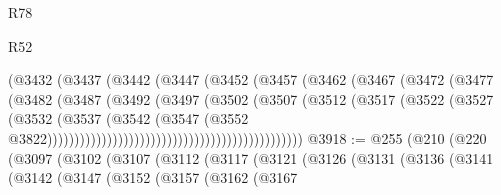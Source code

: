 \begin{lexlean}{R78}
\begin{lexlean}{R52}
\begin{coremodule}
{{{{{{{{{{{{{{{{{{{{{{{{{{{{{{{{{{{{{{{{{{{{{{{{{{{{{{{{{{{{{{{{{{{{{{{{{{{{{{{{{{{{{{{{{{{{{{{{{{{{{{{{{{{{{{{{{{{{{{{{{{{{{{{{{{{{{{{{{{{{{{{{{{{{{{{{{{{{{{{{{{{{{{{{{{{{{{{{{{{{{{{{{{{{{{{{{{{{{{                                                (@3432
                                                  (@3437
                                                    (@3442
                                                      (@3447
                                                        (@3452
                                                          (@3457
                                                            (@3462
                                                              (@3467
                                                                (@3472
                                                                  (@3477
                                                                    (@3482
                                                                      (@3487
                                                                        (@3492
                                                                          (@3497
                                                                            (@3502
                                                                              (@3507
                                                                                (@3512
                                                                                  (@3517
                                                                                    (@3522
                                                                                      (@3527
                                                                                        (@3532
                                                                                          (@3537
                                                                                            (@3542
                                                                                              (@3547
                                                                                                (@3552
                                                                                                  @3822)))))))))))))))))))))))))))))))))))))))))))))))
@3918 := @255
    (@210
      (@220
        (@3097
          (@3102
            (@3107
              (@3112
                (@3117
                  (@3121
                    (@3126
                      (@3131
                        (@3136
                          (@3141
                            (@3142
                              (@3147
                                (@3152
                                  (@3157
                                    (@3162
                                      (@3167
}}}}}}}}}}}}}}}}}}}}}}}}}}}}}}}}}}}}}}}}}}}}}}}}}}}}}}}}}}}}}}}}}}}}}}}}}}}}}}}}}}}}}}}}}}}}}}}}}}}}}}}}}}}}}}}}}}}}}}}}}}}}}}}}}}}}}}}}}}}}}}}}}}}}}}}}}}}}}}}}}}}}}}}}}}}}}}}}}}}}}}}}}}}}}}}}}}}}}}
\end{coremodule}
\end{lexlean}
\end{lexlean}
